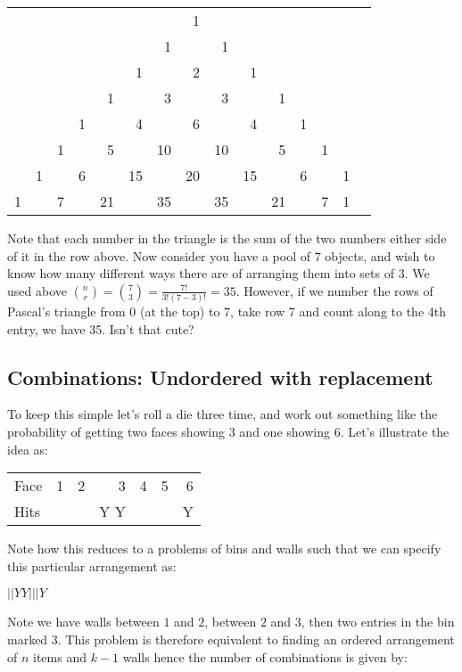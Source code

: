 \documentclass[12pt]{extbook}
\begin{document}
\begin{footnotesize}
\begin{tabular}{rrrrrrrrrrrrrrr}
 & &  &  &  &  &  &1 &  &  &  &  & &\\
 & &  &  &  &  & 1&  &1 &  &  &  & &\\
 & &  &  &  & 1&  &2 &  & 1&  &  & &\\
 & &  &  & 1&  &3 &  &3 &  &1 &  & &\\
 & &  & 1&  &4 &  &6 &  &4 &  &1 & &\\
 & &1 &  & 5&  &10&  &10&  & 5&  &1& \\
 &1&  &6 &  &15&  &20&  &15&  & 6& & 1\\
1& & 7&  &21&  &35&  &35&  &21&  &7&1
\end{tabular}
\end{footnotesize}

Note that each number in the triangle is the sum of the two numbers either side of it in the row above.   Now consider you have a pool of $7$ objects, and wish to know how many different ways there are of arranging them into sets of $3$.   We used above ${n \choose r} = {7 \choose 3} =  \frac{7!}{3!(7-3)!} = 35$.   However, if we number the rows of Pascal's triangle from 0 (at the top) to 7, take row 7 and count along to the 4th entry, we have 35.   Isn't that cute?


 

\subsection{Combinations: Undordered with replacement}

To keep this simple let's roll a die three time, and work out something like the probability of getting two faces showing $3$ and one showing $6$.   Let's illustrate the idea as:

\begin{tabular}{lr|r|r|r|r|r}
Face & 1 & 2 & 3 & 4 & 5 & 6\\
Hits &   &   &Y Y&   &   & Y
\end{tabular}

Note how this reduces to a problems of bins and walls such that we can specify this particular arrangement as:

$||YY|||Y$

Note we have walls between $1$ and $2$, between $2$ and $3$, then two entries in the bin marked $3$.   This problem is therefore equivalent to finding an ordered arrangement of $n$ items and $k-1$ walls hence the number of combinations is given by:
\end{document}
